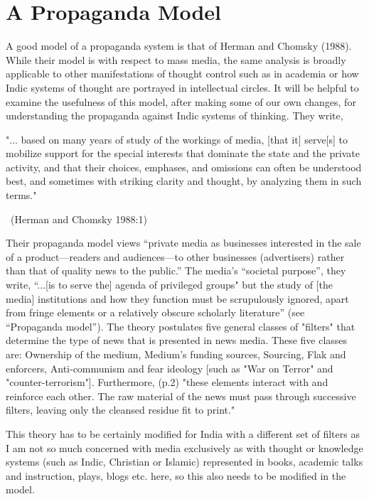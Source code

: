 \section*{A Propaganda Model}
A good model of a propaganda system is that of Herman and Chomsky (1988). While their model is with respect to mass media, the same analysis is broadly applicable to other manifestations of thought control such as in academia or how Indic systems of thought are portrayed in intellectual circles. It will be helpful to examine the usefulness of this model, after making some of our own changes, for understanding the propaganda against Indic systems of thinking. They write, 
\smallskip

\begin{myquote}
"... based on many years of study of the workings of media, [that it] serve[s] to mobilize support for the special interests that dominate the state and the private activity, and that their choices, emphases, and omissions can often be understood best, and sometimes with striking clarity and thought, by analyzing them in such terms."

~\hfill(Herman and Chomsky 1988:1)
\end{myquote}
\smallskip

Their propaganda model views “private media as businesses interested in the sale of a product—readers and audiences—to other businesses (advertisers) rather than that of quality news to the public.” The media's “societal purpose”, they write, “...[is to serve the] agenda of privileged groups" but the study of [the media] institutions and how they function must be scrupulously ignored, apart from fringe elements or a relatively obscure scholarly literature” (see “Propaganda model”). The theory postulates five general classes of "filters" that determine the type of news that is presented in news media. These five classes are: Ownership of the medium, Medium’s funding sources, Sourcing, Flak and enforcers, Anti-communism and fear ideology [such as "War on Terror" and "counter-terrorism"]. Furthermore, (p.2) "these elements interact with and reinforce each other. The raw material of the news must pass through successive filters, leaving only the cleansed residue fit to print."
\vskip 2pt

This theory has to be certainly modified for India with a different set of filters as I am not so much concerned with media exclusively as with thought or knowledge systems (such as Indic, Christian or Islamic) represented in books, academic talks and instruction, plays, blogs etc. here, so this also needs to be modified in the model.

